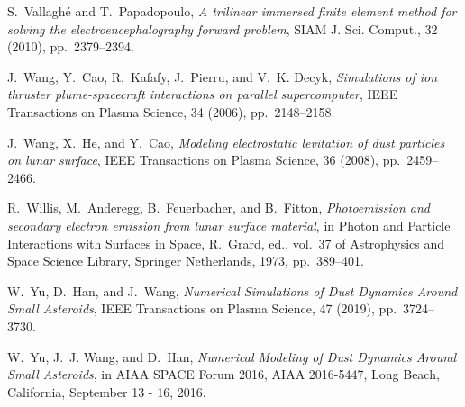 \documentclass{siamart171218}
\begin{document}
\begin{thebibliography}{99}
{\sc S.~Vallagh{\'e} and T.~Papadopoulo}, {\em A trilinear immersed finite
  element method for solving the electroencephalography forward problem}, SIAM
  J. Sci. Comput., 32 (2010), pp.~2379--2394.

{\sc J.~Wang, Y.~Cao, R.~Kafafy, J.~Pierru, and V.~K. Decyk}, {\em Simulations
  of ion thruster plume-spacecraft interactions on parallel supercomputer},
  IEEE Transactions on Plasma Science, 34 (2006), pp.~2148--2158.

{\sc J.~Wang, X.~He, and Y.~Cao}, {\em Modeling electrostatic levitation of
  dust particles on lunar surface}, IEEE Transactions on Plasma Science, 36
  (2008), pp.~2459--2466.

{\sc R.~Willis, M.~Anderegg, B.~Feuerbacher, and B.~Fitton}, {\em Photoemission
  and secondary electron emission from lunar surface material}, in Photon and
  Particle Interactions with Surfaces in Space, R.~Grard, ed., vol.~37 of
  Astrophysics and Space Science Library, Springer Netherlands, 1973,
  pp.~389--401.

{\sc W.~Yu, D.~Han, and J.~Wang}, {\em {{Numerical} {Simulations} of {Dust}
  {Dynamics} {Around} {Small} {Asteroids}}}, IEEE Transactions on Plasma
  Science, 47 (2019), pp.~3724--3730.

{\sc W.~Yu, J.~J. Wang, and D.~Han}, {\em {N}umerical {M}odeling of {D}ust
  {D}ynamics {A}round {S}mall {A}steroids}, in AIAA SPACE Forum 2016, AIAA
  2016-5447, Long Beach, California, September 13 - 16, 2016.

\end{thebibliography}
\end{document}
